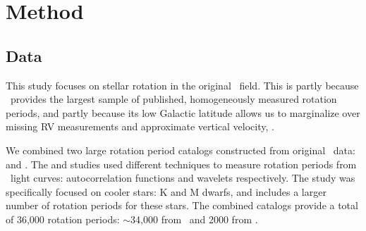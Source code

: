 \section{Method}

\subsection{Data}
\label{sec:data}

This study focuses on stellar rotation in the original \kepler\ field.
This is partly because \kepler\ provides the largest sample of published,
homogeneously measured rotation periods, and partly because its low Galactic
latitude allows us to marginalize over missing RV measurements and approximate
vertical velocity, \vz.

We combined two large rotation period catalogs constructed from original
\kepler\ data: \citet{mcquillan2014} and \citet{santos2019}.
The \citet{mcquillan2014} and \citet{santos2019} studies used different
techniques to measure rotation periods from \kepler\ light curves:
autocorrelation functions and wavelets respectively.
The \citet{santos2019} study was specifically focused on cooler stars: K and M
dwarfs, and includes a larger number of rotation periods for these stars.
The combined catalogs provide a total of 36,000 rotation periods: $\sim$34,000
from \mct\ and 2000 from \citet{santos2019}.

